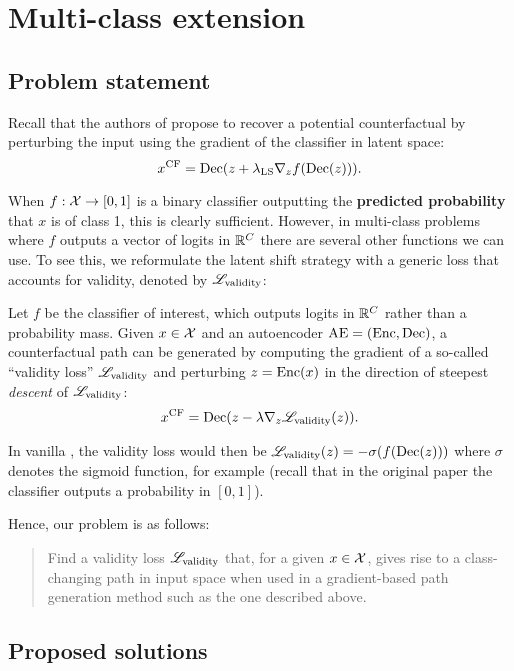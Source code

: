 \documentclass[../main.tex]{subfiles}
\begin{document}
\section{Multi-class extension}

\subsection{Problem statement}

Recall that the authors of \ls{} propose to recover a potential counterfactual by perturbing the input using the gradient of the classifier in latent space:
\begin{equation*}
    x^\mathrm{CF} = \operatorname{Dec}(z + \lambda_\text{LS} \nabla_z f(\operatorname{Dec}(z))).
\end{equation*}

When $f: \mathcal{X} \to [0, 1]$ is a binary classifier outputting the \textbf{predicted probability} that $x$ is of class 1, this is clearly sufficient.
However, in multi-class problems where $f$ outputs a vector of logits in $\mathbb{R}^C$ there are several other functions we can use.
To see this, we reformulate the latent shift strategy with a generic loss that accounts for validity, denoted by $\mathscr{L}_\text{validity}$:

Let $f$ be the classifier of interest, which outputs logits in $\mathbb{R}^C$ rather than a probability mass.
Given $x \in \mathcal{X}$ and an autoencoder $\mathrm{AE} = (\operatorname{Enc}, \operatorname{Dec})$, a counterfactual path can be generated by computing the gradient of a so-called ``validity loss'' $\mathscr{L}_\text{validity}$ and perturbing $z = \operatorname{Enc}(x)$ in the direction of steepest \emph{descent} of $\mathscr{L}_\text{validity}$:
\begin{equation*}
x^\mathrm{CF} = \operatorname{Dec}(z - \lambda \nabla_z \mathscr{L}_\text{validity}(z)).
\end{equation*}

In vanilla \ls{}, the validity loss would then be $\mathscr{L}_\text{validity}(z) = - \sigma(f(\operatorname{Dec}(z)))$ where $\sigma$ denotes the sigmoid function, for example (recall that in the original paper
the classifier outputs a probability in $[0, 1]$).

Hence, our problem is as follows:
\begin{quote}
Find a validity loss $\mathscr{L}_\text{validity}$ that, for a given $x \in \mathcal{X}$, gives rise to a class-changing path in input space when used in a gradient-based path generation method such as the one described above.
\end{quote}

\subsection{Proposed solutions}
\label{sec:validity_losses}
\end{document}
